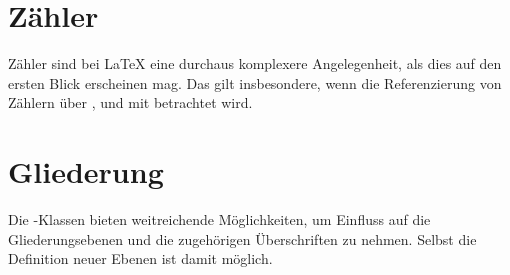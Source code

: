 \section{Zähler}

Zähler sind bei \LaTeX{} eine durchaus komplexere Angelegenheit, als dies auf
den ersten Blick erscheinen mag. Das gilt insbesondere, wenn die
Referenzierung von Zählern über ,  und
 mit betrachtet wird.


\section{Gliederung}

Die \KOMAScript-Klassen bieten weitreichende Möglichkeiten, um Einfluss auf
die Gliederungsebenen und die zugehörigen Überschriften zu nehmen. Selbst die
Definition neuer Ebenen ist damit möglich.

